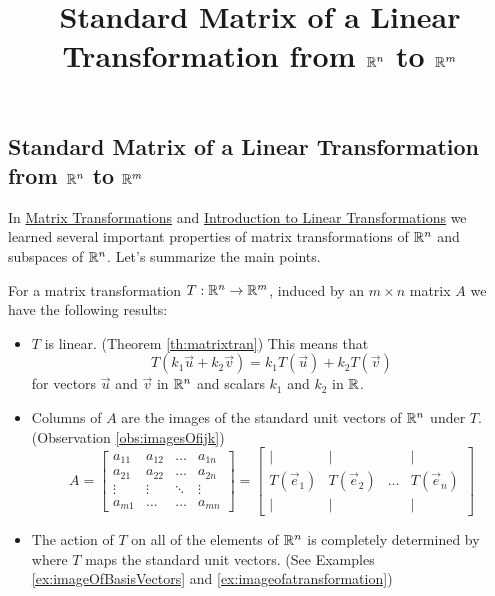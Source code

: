 \documentclass{ximera}
\title{Standard Matrix of a Linear Transformation from $\mathbb{R}^n$ to $\mathbb{R}^m$} \license{CC BY-NC-SA 4.0}
\begin{document}
\begin{abstract}
 \end{abstract}
\maketitle

\begin{onlineOnly}
\section*{Standard Matrix of a Linear Transformation from $\mathbb{R}^n$ to $\mathbb{R}^m$}
\end{onlineOnly}

In \href{https://ximera.osu.edu/linearalgebradzv3/LinearAlgebraInteractiveIntro/LTR-0005/main}{Matrix Transformations} and \href{https://ximera.osu.edu/linearalgebradzv3/LinearAlgebraInteractiveIntro/LTR-0010/main}{Introduction to Linear Transformations} we learned several important properties of matrix transformations of $\mathbb{R}^n$ and subspaces of $\mathbb{R}^n$.  Let's summarize the main points.
\begin{summary}\label{sum:matrixTrans}
For a matrix transformation $T:\mathbb{R}^n\rightarrow\mathbb{R}^m$, induced by an $m\times n$ matrix $A$ we have the following results:
\begin{itemize}
    \item $T$ is linear. (Theorem \ref{th:matrixtran})  This means that 
    $$T(k_1\vec{u}+k_2\vec{v})= k_1T(\vec{u})+k_2T(\vec{v})$$
    for vectors $\vec{u}$ and $\vec{v}$ in $\mathbb{R}^n$ and scalars $k_1$ and $k_2$ in $\mathbb{R}$.
    \item Columns of $A$ are the images of the standard unit vectors of $\mathbb{R}^n$ under $T$. (Observation \ref{obs:imagesOfijk})
 \begin{equation*} \label{eq:matlintrans}
 A=\begin{bmatrix}
           a_{11} & a_{12}&\dots&a_{1n}\\
           a_{21}&a_{22} &\dots &a_{2n}\\
		\vdots & \vdots&\ddots &\vdots\\
		a_{m1}&\dots &\dots &a_{mn}
         \end{bmatrix}
		 = 
         \begin{bmatrix}
           | & |& &|\\
		T(\vec{e}_1) & T(\vec{e}_2)&\dots &T(\vec{e}_n)\\
		|&| & &|
         \end{bmatrix}
\end{equation*}
    
    \item The action of $T$ on all of the elements of $\mathbb{R}^n$ is completely determined by where $T$ maps the standard unit vectors. (See Examples \ref{ex:imageOfBasisVectors} and \ref{ex:imageofatransformation})
\end{itemize}
    
\end{summary}
\end{document}
